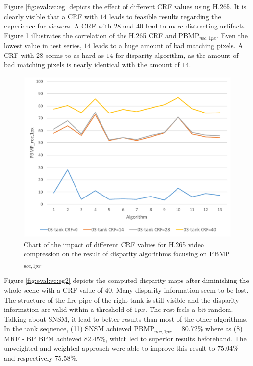 \noindent Figure \ref{fig:eval:vc:eg} depicts the effect of different CRF values using H.265.
It is clearly visible that a CRF with $14$ leads to feasible results regarding the experience for viewers.
A CRF with $28$ and $40$ lead to more distracting artifacts.
Figure \ref{fig:eval-plots-pbmp-noc1-vc} illustrates the correlation of the H.265 CRF and PBMP$_{noc,1px}$.
Even the lowest value in test series, $14$ leads to a huge amount of bad matching pixels.
A CRF with $28$ seems to as hard as $14$ for disparity algorithm, as the amount of bad matching pixels is nearly identical with the amount of $14$.

\begin{figure}[h!]
\centering
\includegraphics[width=1.0\textwidth]{src/images/evaluation/plots/03-tank-pbmp-noc-1-vc.pdf}
\caption[Chart of the impact of video compression]{Chart of the impact of different CRF values for H.265 video compression on the result of disparity algorithms focusing on PBMP$_{noc,1px}$.}
\label{fig:eval-plots-pbmp-noc1-vc}
\end{figure}

\noindent Figure \ref{fig:eval:vc:eg2} depicts the computed disparity maps after diminishing the whole scene with a CRF value of $40$.
Many disparity information seem to be lost.
The structure of the fire pipe of the right tank is still visible and the disparity information are valid within a threshold of $1px$.
The rest feels a bit random.
\newline\newline\noindent Talking about SNSM, it lead to better results than most of the other algorithms.
In the tank sequence, (11) SNSM achieved PBMP$_{noc,1px}$ = 80.72\% where as (8) MRF - BP BPM achieved 82.45\%, which led to superior results beforehand.
The unweighted and weighted approach were able to improve this result to 75.04\% and respectively 75.58\%.

